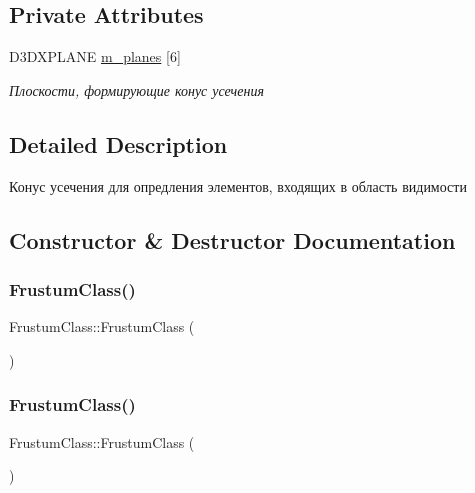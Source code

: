 \subsection*{Private Attributes}
\begin{DoxyCompactItemize}
\item 
D3\+D\+X\+P\+L\+A\+NE \hyperlink{class_frustum_class_a82cb6e582ad45edfef5b28ebd7e1661e}{m\+\_\+planes} \mbox{[}6\mbox{]}
\begin{DoxyCompactList}\small\item\em Плоскости, формирующие конус усечения \end{DoxyCompactList}\end{DoxyCompactItemize}


\subsection{Detailed Description}
Конус усечения для опредления элементов, входящих в область видимости 

\subsection{Constructor \& Destructor Documentation}
\mbox{\label{class_frustum_class_a62130bf46eceff05f1fd7362d826a518}} 
\subsubsection{\texorpdfstring{Frustum\+Class()}{FrustumClass()}\hspace{0.1cm}{\footnotesize\ttfamily [1/2]}}
{\footnotesize\ttfamily Frustum\+Class\+::\+Frustum\+Class (\begin{DoxyParamCaption}{ }\end{DoxyParamCaption})}

\mbox{\label{class_frustum_class_a3e4fb03cda7e5382639522186908d673}} 
\subsubsection{\texorpdfstring{Frustum\+Class()}{FrustumClass()}\hspace{0.1cm}{\footnotesize\ttfamily [2/2]}}
{\footnotesize\ttfamily Frustum\+Class\+::\+Frustum\+Class (\begin{DoxyParamCaption}\item[{const \hyperlink{class_frustum_class}{Frustum\+Class} \&}]{ }\end{DoxyParamCaption})}

